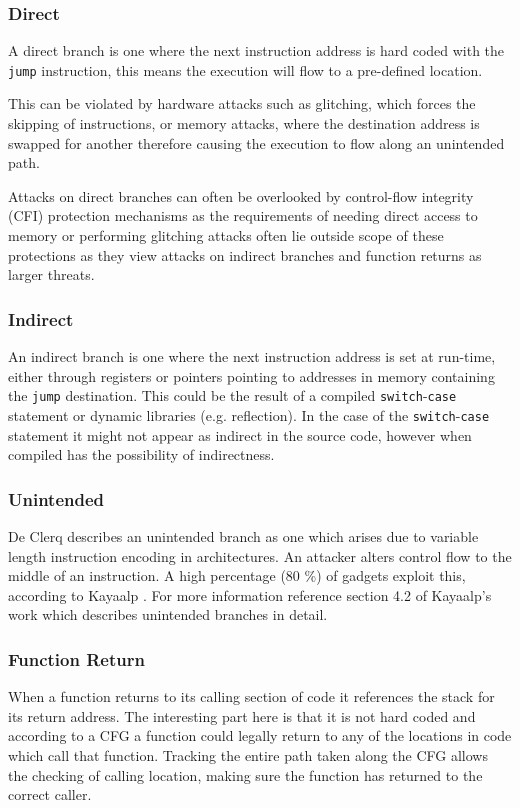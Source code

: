 \subsubsection{Direct}
A direct branch is one where the next instruction address is hard coded with the \verb|jump| instruction, this means the execution will flow to a pre-defined location.

This can be violated by hardware attacks such as glitching, which forces the skipping of instructions, or memory attacks, where the destination address is swapped for another therefore causing the execution to flow along an unintended path.

Attacks on direct branches can often be overlooked by control-flow integrity (CFI) protection mechanisms as the requirements of needing direct access to memory or performing glitching attacks often lie outside scope of these protections as they view attacks on indirect branches and function returns as larger threats.

\subsubsection{Indirect}
An indirect branch is one where the next instruction address is set at run-time, either through registers or pointers pointing to addresses in memory containing the \verb|jump| destination. This could be the result of a compiled \verb|switch|-\verb|case| statement or dynamic libraries (e.g. reflection). In the case of the \verb|switch|-\verb|case| statement it might not appear as indirect in the source code, however when compiled has the possibility of indirectness.


\subsubsection{Unintended}
De Clerq \cite{DeClercq2017} describes an unintended branch as one which arises due to variable length instruction encoding in architectures. An attacker alters control flow to the middle of an instruction. A high percentage (80 \%) of gadgets exploit this, according to Kayaalp \cite{Kayaalp2014}. For more information reference section 4.2 of Kayaalp’s work \cite{Kayaalp2014} which describes unintended branches in detail. 

\subsubsection{Function Return}
When a function returns to its calling section of code it references the stack for its return address. The interesting part here is that it is not hard coded and according to a CFG a function could legally return to any of the locations in code which call that function. Tracking the entire path taken along the CFG allows the checking of calling location, making sure the function has returned to the correct caller.

